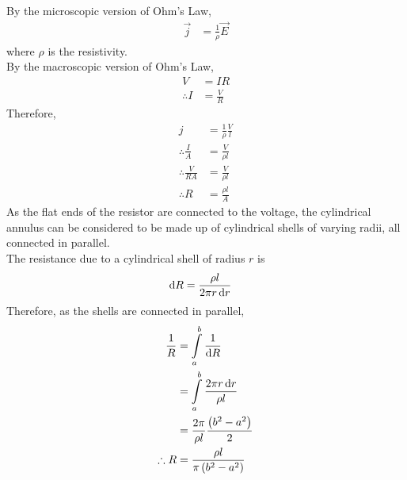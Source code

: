\documentclass[fleqn, a4paper, 12pt, twoside]{article}
\theoremstyle{definition}
\theoremstyle{theorem}
\begin{document}
\begin{solution}
	By the microscopic version of Ohm's Law,
	\begin{align*}
		\overrightarrow{j} & = \frac{1}{\rho} \overrightarrow{E}
	\end{align*}
	where $\rho$ is the resistivity.\\
	By the macroscopic version of Ohm's Law,
	\begin{align*}
		V            & = I R \\
		\therefore I & = \frac{V}{R}
	\end{align*}
	Therefore,
	\begin{align*}
		j                        & = \frac{1}{\rho} \frac{V}{l} \\
		\therefore \frac{I}{A}   & = \frac{V}{\rho l}           \\
		\therefore \frac{V}{R A} & = \frac{V}{\rho l}           \\
		\therefore R             & = \frac{\rho l}{A}
	\end{align*}
	As the flat ends of the resistor are connected to the voltage, the cylindrical annulus can be considered to be made up of cylindrical shells of varying radii, all connected in parallel.\\
	The resistance due to a cylindrical shell of radius $r$ is
	\begin{align*}
		\dif R & = \frac{\rho l}{2 \pi r \dif r}
	\end{align*}
	Therefore, as the shells are connected in parallel,
	\begin{align*}
		\frac{1}{R}  & = \int\limits_{a}^{b} \frac{1}{ \dif R}                   \\
                             & = \int\limits_{a}^{b} \frac{2 \pi r \dif r}{\rho l}       \\
                             & = \frac{2 \pi}{\rho l} \frac{\left( b^2 - a^2 \right)}{2} \\
		\therefore R & = \frac{\rho l}{\pi \left( b^2 - a^2 \right)}
	\end{align*}
\end{solution}
\end{document}
